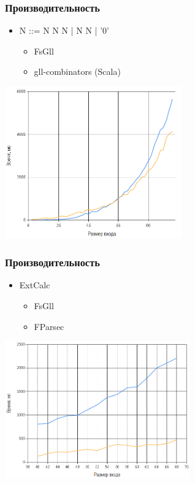 \documentclass{beamer}
\begin{document}
\begin{frame}[fragile]
  \transwipe[direction=90]
  \frametitle{Производительность}
    \begin{itemize}
      \item N ::= N N N | N N | '0'
      \begin{itemize}
        \item \color{colorscala1} FsGll
        \item \color{blue} gll-combinators (Scala)
      \end{itemize}
    \end{itemize}
    \includegraphics[width=7.6cm]{pictures/graph1.png}
\end{frame}

\begin{frame}[fragile]
  \transwipe[direction=90]
  \frametitle{Производительность}
    \begin{itemize}
      \item ExtCalc %
      \begin{itemize}
        \item \color{blue} FsGll
        \item \color{colorscala1} FParsec
      \end{itemize}
    \end{itemize}
    \includegraphics[width=8cm]{pictures/graph2.png}
\end{frame}
\end{document}
